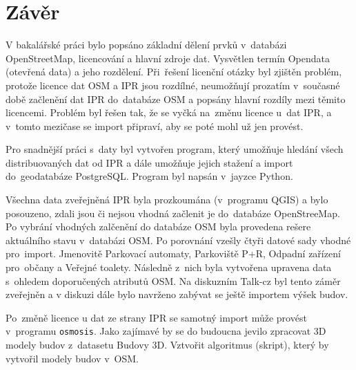 \chapter*{Závěr}
\label{5-zaver}

V bakalářské práci bylo popsáno základní dělení prvků v~databázi
OpenStreetMap, licencování a hlavní zdroje dat. Vysvětlen termín
Opendata (otevřená data) a jeho rozdělení.
Při~řešení licenční otázky byl zjištěn problém, protože licence dat
OSM a IPR jsou rozdílné, neumožňují prozatím v~současné době začlenění 
dat IPR do~databáze OSM a popsány hlavní rozdíly mezi těmito licencemi.
Problém byl řešen tak, že se vyčká na~změnu licence u~dat IPR, a
v~tomto mezičase se import připraví, aby se poté mohl už jen provést.


Pro snadnější práci s~daty byl vytvořen program, který umožňuje hledání
všech distribuovaných dat od IPR a dále umožňuje jejich stažení a
import do~geodatabáze PostgreSQL. Program byl napsán v~jayzce Python.


Všechna data zveřejněná IPR byla prozkoumána (v~programu QGIS)
a bylo posouzeno, zdali jsou či nejsou vhodná začlenit je do~databáze
OpenStreeMap. Po vybrání vhodných zalčenění do databáze OSM byla
provedena rešere aktuálního stavu v~databázi OSM.
Po porovnání vzešly čtyři datové sady vhodné pro~import.
Jmenovitě Parkovací automaty, Parkoviště P+R, Odpadní zařízení
pro~občany a Veřejné toalety. Následně z~nich byla vytvořena upravena
data s~ohledem doporučených atributů OSM. 
Na diskuzním Talk-cz byl tento záměr zveřejněn a v diskuzi dále bylo 
navrženo zabývat se ještě importem výšek budov.


Po~změně licence u dat ze strany IPR se samotný import může provést
v~programu {\tt osmosis}. 
Jako zajímavé by se do budoucna jevilo zpracovat 3D modely budov
z~datasetu Budovy 3D. Vztvořit algoritmus (skript), který by vytvořil 
modely budov v~OSM.
